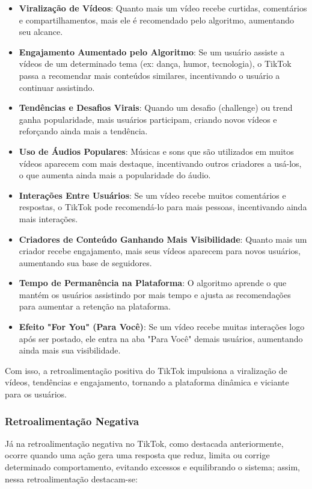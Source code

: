 \begin{itemize}
 \item \textbf{Viralização de Vídeos}: Quanto mais um vídeo recebe curtidas, comentários e compartilhamentos, mais ele é recomendado pelo algoritmo, aumentando seu alcance.
\item \textbf{Engajamento Aumentado pelo Algoritmo}: Se um usuário assiste a vídeos de um determinado tema (ex: dança, humor, tecnologia), o TikTok passa a recomendar mais conteúdos similares, incentivando o usuário a continuar assistindo.
\item \textbf{Tendências e Desafios Virais}: Quando um desafio (challenge) ou trend ganha popularidade, mais usuários participam, criando novos vídeos e reforçando ainda mais a tendência.
\item \textbf{Uso de Áudios Populares}: Músicas e sons que são utilizados em muitos vídeos aparecem com mais destaque, incentivando outros criadores a usá-los, o que aumenta ainda mais a popularidade do áudio.
\item \textbf{Interações Entre Usuários}: Se um vídeo recebe muitos comentários e respostas, o TikTok pode recomendá-lo para mais pessoas, incentivando ainda mais interações.
\item \textbf{Criadores de Conteúdo Ganhando Mais Visibilidade}: Quanto mais um criador recebe engajamento, mais seus vídeos aparecem para novos usuários, aumentando sua base de seguidores.
\item \textbf{Tempo de Permanência na Plataforma}:
O algoritmo aprende o que mantém os usuários assistindo por mais tempo e ajusta as recomendações para aumentar a retenção na plataforma.
\item \textbf{Efeito "For You" (Para Você)}:
Se um vídeo recebe muitas interações logo após ser postado, ele entra na aba "Para Você" demais usuários, aumentando ainda mais sua visibilidade.
\end{itemize}


Com isso, a retroalimentação positiva do TikTok impulsiona a viralização de vídeos, tendências e engajamento, tornando a plataforma dinâmica e viciante para os usuários.\vskip0.3cm

\subsubsection{Retroalimentação Negativa}

Já na retroalimentação negativa no TikTok, como destacada anteriormente, ocorre quando uma ação gera uma resposta que reduz, limita ou corrige determinado comportamento, evitando excessos e equilibrando o sistema; assim, nessa retroalimentação destacam-se:

